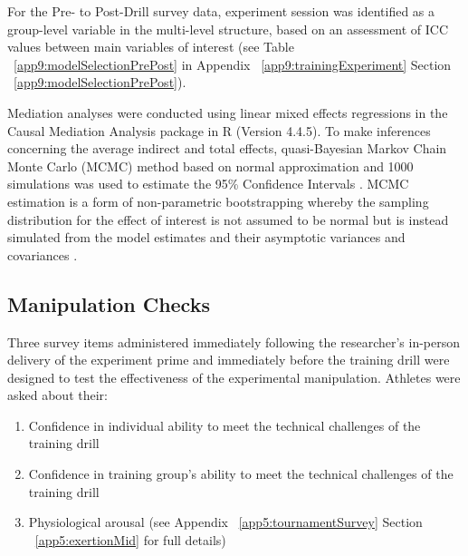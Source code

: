 For the Pre- to Post-Drill survey data, experiment session was identified as a group-level variable in the multi-level structure, based on an assessment of ICC values between main variables of interest (see Table ~\ref{app9:modelSelectionPrePost} in Appendix ~\ref{app9:trainingExperiment} Section ~\ref{app9:modelSelectionPrePost}).

Mediation analyses were conducted using linear mixed effects regressions in the Causal Mediation Analysis package in R (Version 4.4.5).  To make inferences concerning the average indirect and total effects, quasi-Bayesian Markov Chain Monte Carlo (MCMC) method based on normal approximation and 1000 simulations was used to estimate the 95\% Confidence Intervals \citep{Tofighi2016a,Imai2010}. MCMC estimation is a form of non-parametric bootstrapping whereby the sampling distribution for the effect of interest is not assumed to be normal but is instead simulated from the model estimates and their asymptotic variances and covariances \cite{Preacher2008}.





\subsection{Manipulation Checks}
Three survey items administered immediately following the researcher's in-person delivery of the experiment prime and immediately before the training drill were designed to test the effectiveness of the experimental manipulation.  Athletes were asked about their:

\begin{enumerate}
  \item Confidence in individual ability to meet the technical challenges of the training drill
  \item Confidence in training group's ability to meet the technical challenges of the training drill
  \item Physiological arousal (see Appendix ~\ref{app5:tournamentSurvey} Section ~\ref{app5:exertionMid} for full details)
\end{enumerate}

